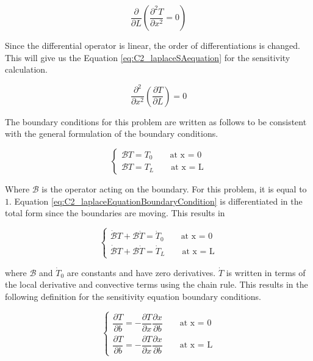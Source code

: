 \begin{equation}\label{eq:C2_differentiatedLaplaceEquation}
    \frac{\partial}{\partial L}
    \left( \frac{\partial^2 T}{\partial x^2} = 0 \right)
\end{equation}

Since the differential operator is linear, the order of differentiations is changed. This will give us the Equation \eqref{eq:C2_laplaceSAequation} for the sensitivity calculation.

\begin{equation}\label{eq:C2_laplaceSAequation}
    \frac{\partial^2}{\partial x^2} \left( \frac{\partial T}{\partial L} \right) = 0
\end{equation}

The boundary conditions for this problem are written as follows to be consistent with the general formulation of the boundary conditions. 

\begin{equation}\label{eq:C2_laplaceEquationBoundaryCondition}
\begin{cases}
    \mathcal{B}T = T_0 \qquad \text{at x = 0} \\
    \mathcal{B}T = T_L \qquad \text{at x = L}
\end{cases}
\end{equation}

Where $\mathcal{B}$ is the operator acting on the boundary. For this problem, it is equal to $1$. Equation \eqref{eq:C2_laplaceEquationBoundaryCondition} is differentiated in the total form since the boundaries are moving. This results in

\begin{equation}
\begin{cases}
    \dot{\mathcal{B}} T + \mathcal{B} \dot{T} = \dot{T}_0 \qquad \text{at x = 0} \\
    \dot{\mathcal{B}} T + \mathcal{B} \dot{T} = \dot{T}_L \qquad \text{at x = L}
\end{cases}
\end{equation}

where $\mathcal{B}$ and $\dot{T}_0$ are constants and have zero derivatives. $\dot{T}$ is written in terms of the local derivative and convective terms using the chain rule. This results in the following definition for the sensitivity equation boundary conditions.

\begin{equation*}
\begin{cases}
    \dfrac{\partial T}{\partial b} = -\dfrac{\partial T}{\partial x} \dfrac{\partial x}{\partial b} \qquad \text{at x = 0}
    \\
    \dfrac{\partial T}{\partial b} = -\dfrac{\partial T}{\partial x} \dfrac{\partial x}{\partial b} \qquad \text{at x = L}
\end{cases}
\end{equation*}

